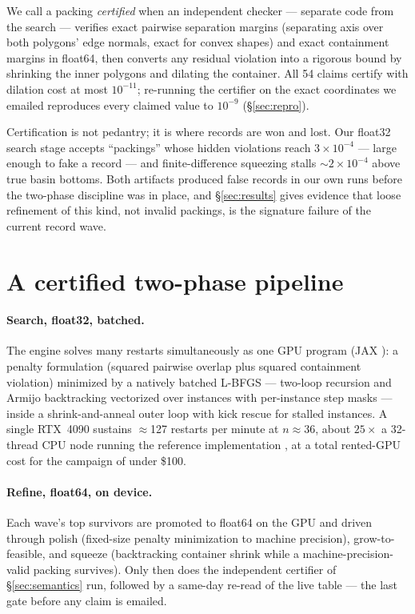 \documentclass[11pt]{article}
\begin{document}
We call a packing \emph{certified} when an independent checker --- separate
code from the search --- verifies exact pairwise separation margins (separating
axis over both polygons' edge normals, exact for convex shapes) and exact
containment margins in float64, then converts any residual violation into a
rigorous bound by shrinking the inner polygons and dilating the container. All
54 claims certify with dilation cost at most $10^{-11}$; re-running the
certifier on the exact coordinates we emailed reproduces every claimed value to
$10^{-9}$ (\S\ref{sec:repro}).

Certification is not pedantry; it is where records are won and lost.
Our float32 search stage accepts ``packings'' whose hidden violations reach
$3\times10^{-4}$ --- large enough to fake a record --- and finite-difference
squeezing stalls $\sim2\times10^{-4}$ above true basin bottoms. Both artifacts
produced false records in our own runs before the two-phase discipline was in
place, and \S\ref{sec:results} gives evidence that loose refinement of this
kind, not invalid packings, is the signature failure of the current record
wave.

\section{A certified two-phase pipeline}\label{sec:pipeline}

\paragraph{Search, float32, batched.}
The engine solves many restarts simultaneously as one GPU program (JAX
\cite{jax}): a penalty formulation (squared pairwise overlap plus squared
containment violation) minimized by a natively batched L-BFGS
\cite{lbfgs} --- two-loop recursion and Armijo backtracking vectorized over
instances with per-instance step masks --- inside a shrink-and-anneal outer
loop with kick rescue for stalled instances. A single RTX~4090 sustains
$\approx$127 restarts per minute at $n\approx36$, about $25\times$ a 32-thread
CPU node running the reference implementation \cite{vallejo-packer}, at a total
rented-GPU cost for the campaign of under \$100.

\paragraph{Refine, float64, on device.}
Each wave's top survivors are promoted to float64 on the GPU and driven through
polish (fixed-size penalty minimization to machine precision), grow-to-feasible,
and squeeze (backtracking container shrink while a machine-precision-valid
packing survives). Only then does the independent certifier of
\S\ref{sec:semantics} run, followed by a same-day re-read of the live table ---
the last gate before any claim is emailed.
\end{document}

